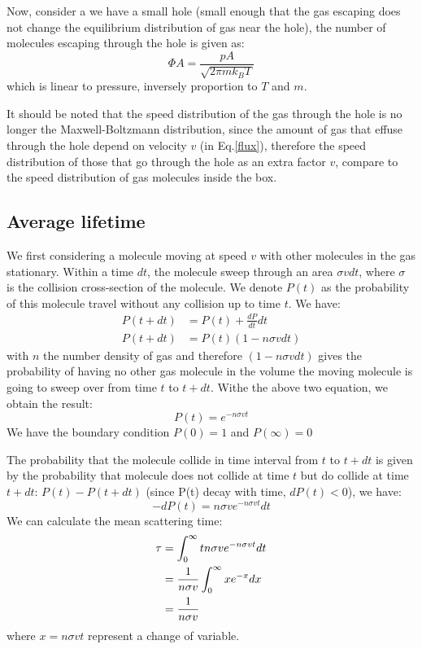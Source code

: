 \documentclass{article}
\begin{document}
Now, consider a we have a small hole (small enough that the gas escaping does not 
change the equilibrium distribution of gas near the hole), the number of molecules
escaping through the hole is given as:
\begin{equation}
    \Phi A = \frac{pA}{\sqrt{2\pi m k_BT}}
\end{equation}
which is linear to pressure, inversely proportion to $T$ and $m$. 

It should be noted that the speed distribution of the gas through the hole is no longer the 
Maxwell-Boltzmann distribution, since the amount of gas that effuse through the 
hole depend on velocity $v$ (in Eq.\ref{flux}), therefore the speed distribution
of those that go through the hole as an extra factor $v$, compare to the speed 
distribution of gas molecules inside the box.

\subsection{Average lifetime}
We first considering a molecule moving at speed $v$ with other molecules in
the gas stationary. Within a time $dt$, the molecule sweep through an area $\sigma v dt$,
where $\sigma$ is the collision cross-section of the molecule. We denote $P(t)$ as 
the probability of this molecule travel without any collision up to time $t$. We have:
\begin{align}
    P(t + dt) &= P(t) + \frac{dP}{dt}dt \\
    P(t + dt) &= P(t) (1 - n\sigma v dt) 
\end{align}
with $n$ the number density of gas and therefore $(1 - n\sigma v dt)$ gives the 
probability of having no other gas molecule in the volume the moving molecule is going 
to sweep over from time $t$ to $t + dt$. 
Withe the above two equation, we obtain the result:
\begin{equation}
    P(t) = e^{-n\sigma vt}
\end{equation}
We have the boundary condition $P(0) = 1$ and $P(\infty) = 0$

The probability that the molecule collide in time interval from $t$ to $t+dt$ is given by
the probability that molecule does not collide at time $t$ but do collide at time $t + dt$:
$P(t) - P(t + dt)$ (since P(t) decay with time, $dP(t) < 0$), we have:
\begin{equation}
    - dP(t) = n\sigma v e^{-n\sigma vt} dt
\end{equation}
We can calculate the mean scattering time:
\begin{align}
    \tau &= \int_{0}^{\infty} t n \sigma v e^{-n\sigma vt} dt \notag \\
         &= \frac{1}{n\sigma v} \int_{0}^{\infty} x e^{-x} dx \notag \\
         &= \frac{1}{n\sigma v}
\end{align}
where $x = n\sigma v t$ represent a change of variable.
\end{document}
